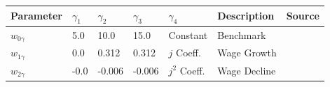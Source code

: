 \small\begin{tabular}{l l l l l l} 
\hline 
 Parameter & $\gamma_1$ &  $\gamma_2$ & $\gamma_3$ & $\gamma_4$ & Description & Source \\ 
\hline 
$w_{0\gamma}$ & 5.0 & 10.0 
               & 15.0 
               & Constant & Benchmark \\ 
$w_{1\gamma}$ & 0.0 & 0.312 
               & 0.312 
               & $j$ Coeff. & Wage Growth \\ 
$w_{2\gamma}$ & -0.0 & -0.006 
               & -0.006  
               & $j^{2}$ Coeff. & Wage Decline \\ 
\hline 
\end{tabular}